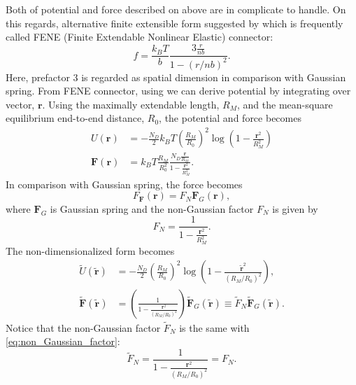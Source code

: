 \message{ !name(brief_Brownian_dynamics.tex)}\documentclass[10pt, a4paper]{report}
\begin{document}
Both of potential and force described on above are in complicate to handle. On this regards,  alternative finite extensible form suggested by \textcite{HaroldR.Warner1972} which is frequently called FENE (Finite Extendable Nonlinear Elastic) connector:
\begin{equation}
  f = \frac{k_BT}{b}\frac{3\frac{r}{nb}}{1-(r/nb)^2}.
\end{equation}
Here, prefactor $3$ is regarded as spatial dimension in comparison with Gaussian spring. 
From FENE connector, using we can derive potential by integrating over vector, $\mathbf{r}$.
Using the maximally extendable length, $R_M$, and the mean-square equilibrium end-to-end distance, $R_0$, the potential and force becomes
\begin{align}
U(\mathbf{r}) &= - \frac{N_D}{2}k_BT\left(\frac{R_M}{R_0}\right)^2\log\left(1 - \frac{\mathbf{r}^2}{R_M^2}\right) \\
\mathbf{F}(\mathbf{r}) &= k_BT\frac{R_M}{R_0^2}\frac{N_D\frac{\mathbf{r}}{R_M}}{1-\frac{\mathbf{r}^2}{R_M^2}}.
\end{align}
In comparison with Gaussian spring, the force becomes
\begin{equation}F_
\mathbf{F}(\mathbf{r}) = F_N\mathbf{F}_G(\mathbf{r}),
\end{equation}
where $\mathbf{F}_G$ is Gaussian spring and the non-Gaussian factor $F_N$ is given by
\begin{equation}
F_N = \frac{1}{1-\frac{\mathbf{r}^2}{R_M^2}}.\label{eq:non_Gaussian_factor}
\end{equation}
The non-dimensionalized form becomes
\begin{align}
\tilde{U}(\tilde{\mathbf{r}}) &= -\frac{N_D}{2}\left(\frac{R_M}{R_0}\right)^2\log\left(1-\frac{\tilde{\mathbf{r}}^2}{(R_M/R_0)^2}\right),\\
\tilde{\mathbf{F}}(\tilde{\mathbf{r}}) &= \left(\frac{1}{1 - \frac{\mathbf{r}^2}{(R_M/R_0)^2}}\right)\tilde{\mathbf{F}}_G(\tilde{\mathbf{r}}) \equiv \tilde{F}_N\tilde{\mathbf{F}}_G(\tilde{\mathbf{r}}).
\end{align}
Notice that the non-Gaussian factor $\tilde{F}_N$ is the same with \eqref{eq:non_Gaussian_factor}:
\begin{equation}
\tilde{F}_N = \frac{1}{1 - \frac{\mathbf{r}^2}{(R_M/R_0)^2}} = F_N.
\end{equation}
\end{document}
